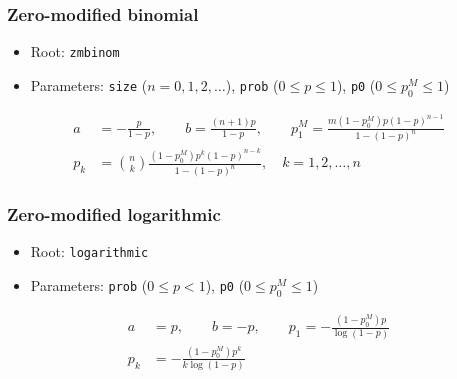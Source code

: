 \documentclass[x11names]{article}
\newcommand{\code}[1]{\texttt{#1}}
\begin{document}
\subsubsection{Zero-modified binomial}

\begin{itemize}
\item Root: \code{zmbinom}
\item Parameters: \code{size} ($n = 0, 1, 2, \dots$),
  \code{prob} ($0 \leq p \leq 1$),
  \code{p0} ($0 \leq p_0^M \leq 1$)
\end{itemize}
\begin{align*}
  a &= -\frac{p}{1 - p}, \qquad b = \frac{(n + 1)p}{1 - p}, \qquad
      p_1^M = \frac{m (1 - p_0^M) p (1 - p)^{n - 1}}{1 - (1 - p)^n} \\
  p_k &= \binom{n}{k} \frac{(1 - p_0^M) p^k (1 - p)^{n - k}}{1 - (1 - p)^n}, \quad
        k = 1, 2, \dots, n
\end{align*}

\subsubsection{Zero-modified logarithmic}

\begin{itemize}
\item Root: \code{logarithmic}
\item Parameters: \code{prob} ($0 \leq p < 1$),
  \code{p0} ($0 \leq p_0^M \leq 1$)
\end{itemize}
\begin{align*}
  a &= p, \qquad b = -p, \qquad
      p_1 = - \frac{(1 - p_0^M) p}{\log (1 - p)} \\
  p_k &= - \frac{(1 - p_0^M) p^k}{k \log (1 - p)}
\end{align*}


\end{document}
